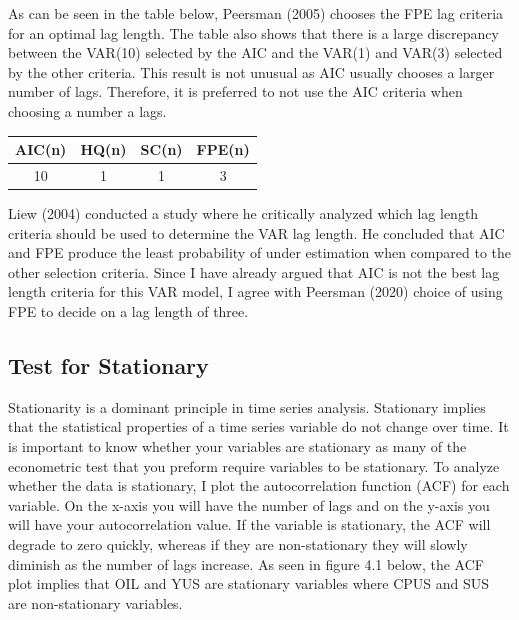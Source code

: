 \documentclass[11pt,preprint, authoryear]{elsarticle}
\numberwithin{equation}{section}
\numberwithin{figure}{section}
\numberwithin{table}{section}
\begin{document}
As can be seen in the table below, Peersman (2005) chooses the FPE lag
criteria for an optimal lag length. The table also shows that there is a
large discrepancy between the VAR(10) selected by the AIC and the VAR(1)
and VAR(3) selected by the other criteria. This result is not unusual as
AIC usually chooses a larger number of lags. Therefore, it is preferred
to not use the AIC criteria when choosing a number a lags.

\begin{center}
\begin{tabular}{ |c|c|c|c| } 
 \hline
 AIC(n) & HQ(n) & SC(n) & FPE(n) \\ 
 \hline
 10 & 1 & 1 & 3\\ 
 \hline
\end{tabular}
\end{center}

Liew (2004) conducted a study where he critically analyzed which lag
length criteria should be used to determine the VAR lag length. He
concluded that AIC and FPE produce the least probability of under
estimation when compared to the other selection criteria. Since I have
already argued that AIC is not the best lag length criteria for this VAR
model, I agree with Peersman (2020) choice of using FPE to decide on a
lag length of three.

\hypertarget{test-for-stationary}{%
\subsection{\texorpdfstring{Test for Stationary
\label{stationary}}{Test for Stationary }}\label{test-for-stationary}}

Stationarity is a dominant principle in time series analysis. Stationary
implies that the statistical properties of a time series variable do not
change over time. It is important to know whether your variables are
stationary as many of the econometric test that you preform require
variables to be stationary. To analyze whether the data is stationary, I
plot the autocorrelation function (ACF) for each variable. On the x-axis
you will have the number of lags and on the y-axis you will have your
autocorrelation value. If the variable is stationary, the ACF will
degrade to zero quickly, whereas if they are non-stationary they will
slowly diminish as the number of lags increase. As seen in figure 4.1
below, the ACF plot implies that OIL and YUS are stationary variables
where CPUS and SUS are non-stationary variables.
\end{document}
